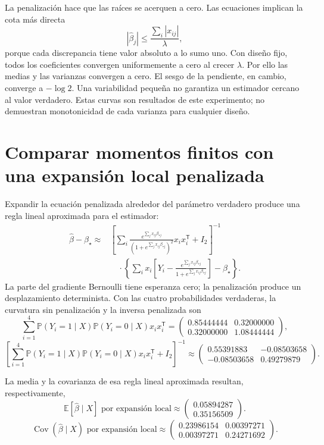 \documentclass[11pt,a4paper]{article}
\newcommand{\E}{\mathbb E}
\newcommand{\Prob}{\mathbb P}
\newcommand{\T}{^{\mathsf T}}
\DeclareMathOperator{\Cov}{Cov}
\begin{document}
La penalización hace que las raíces se acerquen a cero.
Las ecuaciones implican la cota más directa
\[
|\widehat\beta_j|
\le\frac{\sum_i|x_{ij}|}{\lambda},
\]
porque cada discrepancia tiene valor absoluto a lo sumo uno.
Con diseño fijo, todos los coeficientes convergen
uniformemente a cero al crecer \(\lambda\).
Por ello las medias y las varianzas convergen a cero.
El sesgo de la pendiente, en cambio, converge a \(-\log2\).
Una variabilidad pequeña no garantiza un estimador
cercano al valor verdadero.
Estas curvas son resultados de este experimento;
no demuestran monotonicidad de cada varianza
para cualquier diseño.

\clearpage
\section{Comparar momentos finitos con una expansión local penalizada}\label{logit147}
Expandir la ecuación penalizada alrededor del parámetro verdadero
produce una regla lineal aproximada para el estimador:
\[
\begin{aligned}
\widehat\beta-\beta_\star\approx&
\left[
\sum_i\frac{e^{\sum_jx_{ij}\beta_{\star j}}}
{(1+e^{\sum_jx_{ij}\beta_{\star j}})^2}x_ix_i\T+I_2
\right]^{-1}\\
&\quad\cdot\left\{
\sum_i x_i\left[Y_i-
\frac{e^{\sum_jx_{ij}\beta_{\star j}}}
{1+e^{\sum_jx_{ij}\beta_{\star j}}}\right]
-\beta_\star\right\}.
\end{aligned}
\]
La parte del gradiente Bernoulli tiene esperanza cero;
la penalización produce un desplazamiento determinista.
Con las cuatro probabilidades verdaderas, la curvatura
sin penalización y la inversa penalizada son
\[
\sum_{i=1}^4\Prob(Y_i=1\mid X)\Prob(Y_i=0\mid X)x_ix_i\T=\begin{pmatrix}0.85444444&0.32000000\\0.32000000&1.08444444\end{pmatrix},
\]
\[
\left[\sum_{i=1}^4\Prob(Y_i=1\mid X)\Prob(Y_i=0\mid X)x_ix_i\T+I_2\right]^{-1}\approx\begin{pmatrix}0.55391883&-0.08503658\\-0.08503658&0.49279879\end{pmatrix}.
\]

La media y la covarianza de esa regla lineal aproximada
resultan, respectivamente,
\[
\E[\widehat\beta\mid X]\text{ por expansión local}\approx\begin{pmatrix}0.05894287\\0.35156509\end{pmatrix}.
\]
\[
\Cov(\widehat\beta\mid X)\text{ por expansión local}\approx\begin{pmatrix}0.23986154&0.00397271\\0.00397271&0.24271692\end{pmatrix}.
\]
\end{document}
